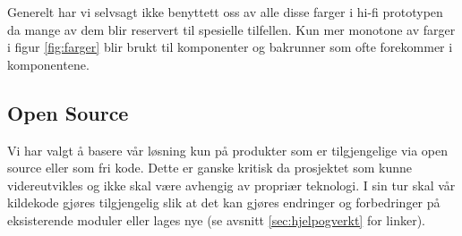 Generelt har vi selvsagt ikke benyttett oss av alle disse farger i hi-fi prototypen da mange av dem blir reservert til spesielle tilfellen. Kun mer monotone av farger i figur \ref{fig:farger} blir brukt til komponenter og bakrunner som ofte forekommer i komponentene.

\subsection{Open Source}
Vi har valgt å basere vår løsning kun på produkter som er tilgjengelige via open source eller som fri kode. Dette er ganske kritisk da prosjektet som kunne videreutvikles og ikke skal være avhengig av propriær teknologi. I sin tur skal vår kildekode gjøres tilgjengelig slik at det kan gjøres endringer og forbedringer på eksisterende moduler eller lages nye (se avsnitt \ref{sec:hjelpogverkt} for linker). 